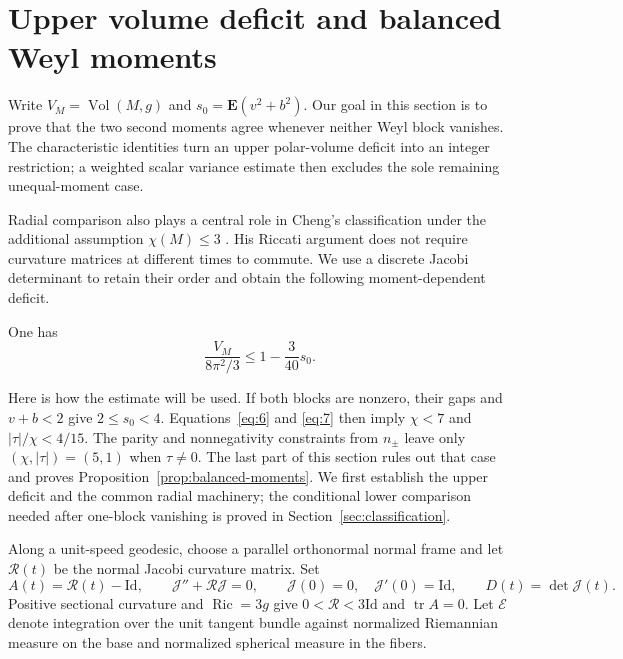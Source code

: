 \section{Upper volume deficit and balanced Weyl moments}
\label{sec:volume}

Write $V_M=\operatorname{Vol}(M,g)$ and $s_0=\mathbf E(v^2+b^2)$.
Our goal in this section is to prove that the two second moments agree
whenever neither Weyl block vanishes. The characteristic identities
turn an upper polar-volume deficit into an integer restriction; a
weighted scalar variance estimate then excludes the sole remaining
unequal-moment case.

Radial comparison also plays a central role in Cheng's classification
under the additional assumption $\chi(M)\le3$
\cite[Proposition~3.1]{Cheng2026}. His Riccati argument does not require
curvature matrices at different times to commute. We use a discrete
Jacobi determinant to retain their order and obtain the following
moment-dependent deficit.

\begin{proposition}\label{prop:upper-volume-deficit}
One has
\[
 \frac{V_M}{8\pi^2/3}\le 1-\frac{3}{40}s_0.
 \tag{7}\label{eq:7}
\]
\end{proposition}

Here is how the estimate will be used. If both blocks are nonzero, their
gaps and $v+b<2$ give $2\le s_0<4$. Equations~\eqref{eq:6} and
\eqref{eq:7} then imply $\chi<7$ and $|\tau|/\chi<4/15$.
The parity and nonnegativity constraints from $n_\pm$ leave only
$(\chi,|\tau|)=(5,1)$ when $\tau\ne0$. The last part of this section
rules out that case and proves Proposition~\ref{prop:balanced-moments}.
We first establish the upper deficit and the common radial machinery;
the conditional lower comparison needed after one-block vanishing is
proved in Section~\ref{sec:classification}.

Along a unit-speed geodesic, choose a parallel orthonormal normal frame
and let $\mathcal R(t)$ be the normal Jacobi curvature matrix.  Set
\[
 A(t)=\mathcal R(t)-\mathrm{Id},\qquad
 \mathcal J''+\mathcal R\mathcal J=0,\qquad
 \mathcal J(0)=0,\quad \mathcal J'(0)=\mathrm{Id},\qquad
 D(t)=\det\mathcal J(t).
\]
Positive sectional curvature and $\operatorname{Ric}=3g$ give
$0<\mathcal R<3\mathrm{Id}$ and $\operatorname{tr}A=0$.
Let $\mathcal E$ denote integration over the unit tangent bundle against
normalized Riemannian measure on the base and normalized spherical
measure in the fibers.

